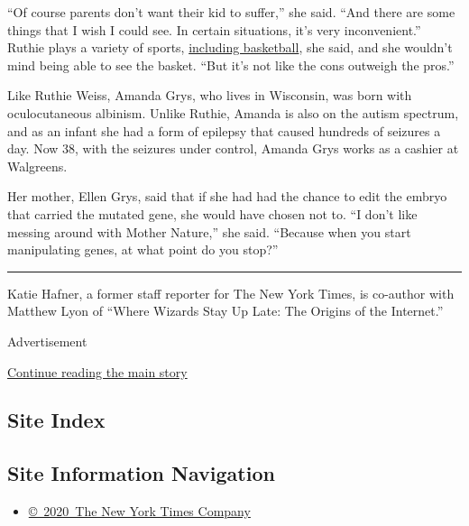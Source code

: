 ``Of course parents don't want their kid to suffer,'' she said. ``And
there are some things that I wish I could see. In certain situations,
it's very inconvenient.'' Ruthie plays a variety of sports,
\href{https://twitter.com/ethanjweiss/status/1056641212256477184?lang=en}{including
basketball}, she said, and she wouldn't mind being able to see the
basket. ``But it's not like the cons outweigh the pros.''

Like Ruthie Weiss, Amanda Grys, who lives in Wisconsin, was born with
oculocutaneous albinism. Unlike Ruthie, Amanda is also on the autism
spectrum, and as an infant she had a form of epilepsy that caused
hundreds of seizures a day. Now 38, with the seizures under control,
Amanda Grys works as a cashier at Walgreens.

Her mother, Ellen Grys, said that if she had had the chance to edit the
embryo that carried the mutated gene, she would have chosen not to. ``I
don't like messing around with Mother Nature,'' she said. ``Because when
you start manipulating genes, at what point do you stop?''

\begin{center}\rule{0.5\linewidth}{\linethickness}\end{center}

Katie Hafner, a former staff reporter for The New York Times, is
co-author with Matthew Lyon of ``Where Wizards Stay Up Late: The Origins
of the Internet.''

Advertisement

\protect\hyperlink{after-bottom}{Continue reading the main story}

\hypertarget{site-index}{%
\subsection{Site Index}\label{site-index}}

\hypertarget{site-information-navigation}{%
\subsection{Site Information
Navigation}\label{site-information-navigation}}

\begin{itemize}
\tightlist
\item
  \href{https://help.nytimes3xbfgragh.onion/hc/en-us/articles/115014792127-Copyright-notice}{©~2020~The
  New York Times Company}
\end{itemize}

